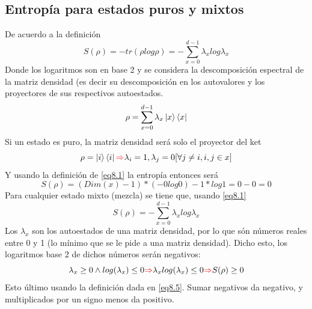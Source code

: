 \documentclass{book}
\begin{document}
    \subsection{{Entropía para estados puros y mixtos}}  De acuerdo a la definición
    \begin{equation}\label{eq8.1}{S(\rho)=-tr(\rho log \rho)=-\sum_{x=0}^{d-1} \lambda_x log \lambda_x} \end{equation}
    Donde los logaritmos son en base 2 y se considera la descomposición espectral de la matriz densidad (es decir su descomposición en los autovalores y los proyectores de sus respectivos autoestados.
    \begin{equation}\label{eq8.2}{\rho=\sum_{x=0}^{d-1}\lambda_x\ket{x}\bra{x}}\end{equation}
    Si un estado es puro, la matriz densidad será solo el proyector del ket
    \begin{equation}\label{eq8.3}{\rho=\ket{i}\bra{i}\textcolor{red}{\Rightarrow} \lambda_i=1, \lambda_j=0 [\forall j\neq i, i, j \in x]}\end{equation}
    Y usando la definición de \ref{eq8.1} la entropía entonces será
    \begin{equation}\label{eq8.4}{S(\rho)=(Dim(x)-1)*(-0log0)-1*log 1=0-0=0}\end{equation}
    Para cualquier estado mixto (mezcla) se tiene que, usando \ref{eq8.1}
    \begin{equation}\label{eq8.5}{ S(\rho)=-\sum_{x=0}^{d-1}\lambda_xlog\lambda_x}\end{equation}
    Los $\lambda_x$ son los autoestados de una matriz densidad, por lo que són números reales entre 0 y 1 (lo mínimo que se le pide a una matriz densidad). Dicho esto, los logaritmos base 2 de dichos números serán negativos:
    \begin{equation}\label{eq8.6} {\lambda_x\geq 0 \wedge log(\lambda_x)\leq 0 \textcolor{red}{\Rightarrow} \lambda_x log(\lambda_x)\leq 0 \textcolor{red}{\Rightarrow} S(\rho)\geq 0}\end{equation}
    Esto último usando la definición dada en \ref{eq8.5}. Sumar negativos da negativo, y multiplicados por un signo menos da positivo.
\end{document}
